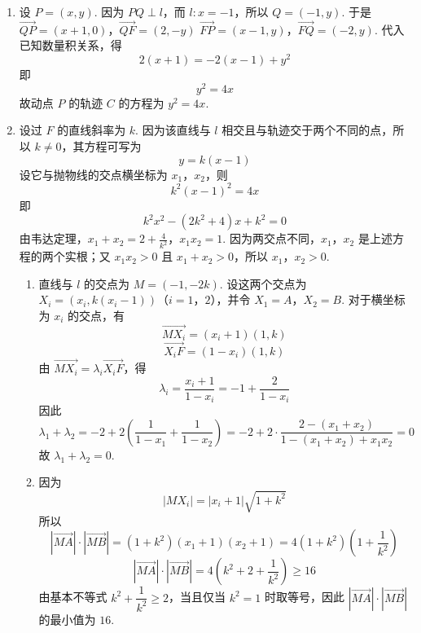 \begin{solution}
\begin{enumerate}
\item 设 \(P=(x,y)\). 因为 \(PQ\perp l\)，而 \(l:x=-1\)，所以 \(Q=(-1,y)\). 于是
\(\overrightarrow{QP}=(x+1,0)\)，\(\overrightarrow{QF}=(2,-y)\)
\(\overrightarrow{FP}=(x-1,y)\)，\(\overrightarrow{FQ}=(-2,y)\).
代入已知数量积关系，得
\[
2(x+1)=-2(x-1)+y^2
\]
即
\[
y^2=4x
\]
故动点 \(P\) 的轨迹 \(C\) 的方程为 \(y^2=4x\).
\item 设过 \(F\) 的直线斜率为 \(k\). 因为该直线与 \(l\) 相交且与轨迹交于两个不同的点，所以 \(k\neq0\)，其方程可写为
\[
y=k(x-1)
\]
设它与抛物线的交点横坐标为 \(x_1\)，\(x_2\)，则
\[
k^2(x-1)^2=4x
\]
即
\[
k^2x^2-(2k^2+4)x+k^2=0
\]
由韦达定理，\(x_1+x_2=2+\frac{4}{k^2}\)，\(x_1x_2=1\).
因为两交点不同，\(x_1\)，\(x_2\) 是上述方程的两个实根；又 \(x_1x_2>0\) 且 \(x_1+x_2>0\)，所以 \(x_1\)，\(x_2>0\).
\begin{enumerate}
\item 直线与 \(l\) 的交点为 \(M=(-1,-2k)\). 设这两个交点为 \(X_i=(x_i,k(x_i-1))\)（\(i=1\)，\(2\)），并令 \(X_1=A\)，\(X_2=B\). 对于横坐标为 \(x_i\) 的交点，有
\[
\overrightarrow{MX_i}=(x_i+1)(1,k)
\]
\[
\overrightarrow{X_iF}=(1-x_i)(1,k)
\]
由 \(\overrightarrow{MX_i}=\lambda_i\overrightarrow{X_iF}\)，得
\[
\lambda_i=\frac{x_i+1}{1-x_i}=-1+\frac{2}{1-x_i}
\]
因此
\[
\lambda_1+\lambda_2=-2+2\left(\frac{1}{1-x_1}+\frac{1}{1-x_2}\right)
 =-2+2\cdot\frac{2-(x_1+x_2)}{1-(x_1+x_2)+x_1x_2}=0
\]
故 \(\lambda_1+\lambda_2=0\).
\item 因为
\[
|MX_i|=|x_i+1|\sqrt{1+k^2}
\]
所以
\[
|\overrightarrow{MA}|\cdot|\overrightarrow{MB}|
 =(1+k^2)(x_1+1)(x_2+1)
 =4(1+k^2)\left(1+\frac{1}{k^2}\right)
\]
\[
|\overrightarrow{MA}|\cdot|\overrightarrow{MB}|
 =4\left(k^2+2+\frac{1}{k^2}\right)\geqslant16
\]
由基本不等式 \(k^2+\dfrac{1}{k^2}\geqslant2\)，当且仅当 \(k^2=1\) 时取等号，因此 \(\left|\overrightarrow{MA}\right|\cdot\left|\overrightarrow{MB}\right|\) 的最小值为 \(16\).
\end{enumerate}
\end{enumerate}
\end{solution}
